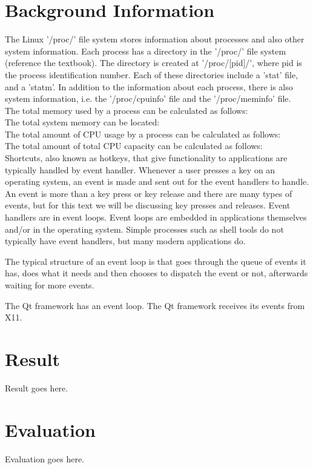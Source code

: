 \documentclass[12pt]{article}
\begin{document}
	\section{Background Information}
	The Linux '/proc/' file system stores information about processes and also other system information. Each process has a directory in the '/proc/' file system (reference the textbook). The directory is created at '/proc/[pid]/', where pid is the process identification number. Each of these directories include a 'stat' file, and a 'statm'. In addition to the information about each process, there is also system information, i.e. the '/proc/cpuinfo' file and the '/proc/meminfo' file.\\
	The total memory used by a process can be calculated as follows:\\
	The total system memory can be located:\\
	The total amount of CPU usage by a process can be calculated as follows:\\
	The total amount of total CPU capacity can be calculated as follows:\\
	
Shortcuts, also known as hotkeys, that give functionality to applications are typically handled by event handler. Whenever a user presses a key on an operating system, an event is made and sent out for the event handlers to handle. An event is more than a key press or key release and there are many types of events, but for this text we will be discussing key presses and releases. Event handlers are in event loops. Event loops are embedded in applications themselves and/or in the operating system. Simple processes such as shell tools do not typically have event handlers, but many modern applications do.

The typical structure of an event loop is that goes through the queue of events it has, does what it needs and then chooses to dispatch the event or not, afterwards waiting for more events. 

The Qt framework has an event loop. The Qt framework receives its events from X11. 


	
	\section{Result}
	Result goes here.
	
	\section{Evaluation}
	Evaluation goes here.
	
\end{document}
